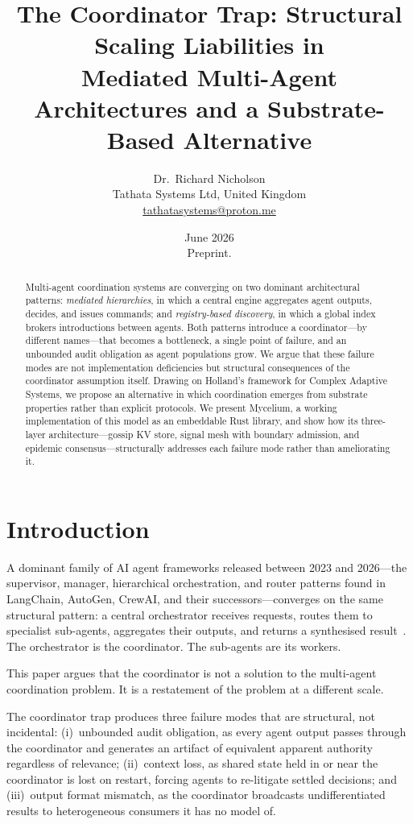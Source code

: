 \documentclass[11pt]{article}
\title{\textbf{The Coordinator Trap: Structural Scaling Liabilities in\\
Mediated Multi-Agent Architectures and a Substrate-Based Alternative}}
\author{%
  Dr.\ Richard Nicholson\\[4pt]
  \small Tathata Systems Ltd, United Kingdom\\
  \small \href{mailto:tathatasystems@proton.me}{tathatasystems@proton.me}
}
\date{June 2026\\[4pt]
\small Preprint.}
\begin{document}
\maketitle

\begin{abstract}
Multi-agent coordination systems are converging on two dominant architectural
patterns: \emph{mediated hierarchies}, in which a central engine aggregates agent
outputs, decides, and issues commands; and \emph{registry-based discovery}, in
which a global index brokers introductions between agents. Both patterns introduce
a coordinator---by different names---that becomes a bottleneck, a single point of
failure, and an unbounded audit obligation as agent populations grow. We
argue that these failure modes are not implementation deficiencies
but structural consequences of the coordinator assumption itself. Drawing on
Holland's framework for Complex Adaptive Systems, we propose an alternative in
which coordination emerges from substrate properties rather than explicit
protocols. We present Mycelium, a working implementation of this model as an
embeddable Rust library, and show how its three-layer architecture---gossip KV
store, signal mesh with boundary admission, and epidemic consensus---structurally
addresses each failure mode rather than ameliorating it.
\end{abstract}

\section{Introduction}

A dominant family of AI agent frameworks released between 2023 and 2026---the
supervisor, manager, hierarchical orchestration, and router patterns found in
LangChain, AutoGen, CrewAI, and their successors---converges on the same
structural pattern: a central orchestrator receives requests, routes them to
specialist sub-agents, aggregates their outputs, and returns a synthesised
result~\cite{silobench,mas-survey,raps}. The orchestrator is the coordinator.
The sub-agents are its workers.

This paper argues that the coordinator is not a solution to the multi-agent
coordination problem. It is a restatement of the problem at a different scale.

The coordinator trap produces three failure modes that are structural, not
incidental: (i)~unbounded audit obligation, as every agent output passes through
the coordinator and generates an artifact of equivalent apparent authority
regardless of relevance; (ii)~context loss, as shared state held in or near the
coordinator is lost on restart, forcing agents to re-litigate settled decisions;
and (iii)~output format mismatch, as the coordinator broadcasts undifferentiated
results to heterogeneous consumers it has no model of.
\end{document}
